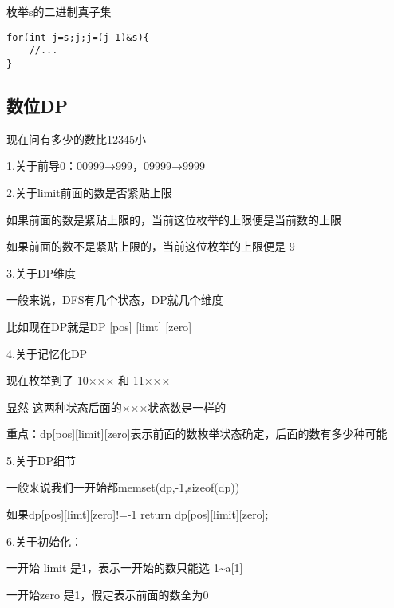 \documentclass[]{article}
\begin{document}
枚举s的二进制真子集

\begin{verbatim}
for(int j=s;j;j=(j-1)&s){
    //...
}
\end{verbatim}

\hypertarget{ux6570ux4f4ddp}{%
\subsection{数位DP}\label{ux6570ux4f4ddp}}

现在问有多少的数比12345小

1.关于前导0：00999→999，09999→9999

2.关于limit前面的数是否紧贴上限

如果前面的数是紧贴上限的，当前这位枚举的上限便是当前数的上限

如果前面的数不是紧贴上限的，当前这位枚举的上限便是 9

3.关于DP维度

一般来说，DFS有几个状态，DP就几个维度　　

比如现在DP就是DP {[}pos{]} {[}limt{]} {[}zero{]}

4.关于记忆化DP

现在枚举到了 10××× 和 11×××

显然 这两种状态后面的×××状态数是一样的

重点：dp{[}pos{]}{[}limit{]}{[}zero{]}表示前面的数枚举状态确定，后面的数有多少种可能

5.关于DP细节

一般来说我们一开始都memset(dp,-1,sizeof(dp))

如果dp{[}pos{]}{[}limt{]}{[}zero{]}!=-1 return
dp{[}pos{]}{[}limit{]}{[}zero{]};

6.关于初始化：

一开始 limit 是1，表示一开始的数只能选 1\textasciitilde a{[}1{]}

一开始zero 是1，假定表示前面的数全为0
\end{document}
